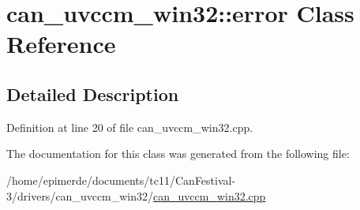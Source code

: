 \hypertarget{classcan__uvccm__win32_1_1error}{
\section{can\_\-uvccm\_\-win32::error Class Reference}
\label{classcan__uvccm__win32_1_1error}
}


\subsection{Detailed Description}




Definition at line 20 of file can\_\-uvccm\_\-win32.cpp.

The documentation for this class was generated from the following file:\begin{CompactItemize}
\item 
/home/epimerde/documents/tc11/Can\-Festival-3/drivers/can\_\-uvccm\_\-win32/\hyperlink{can__uvccm__win32_8cpp}{can\_\-uvccm\_\-win32.cpp}\end{CompactItemize}
